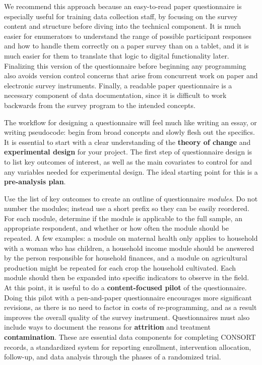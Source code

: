 We recommend this approach because an easy-to-read paper questionnaire
is especially useful for training data collection staff,
by focusing on the survey content and structure before diving into the technical component.
It is much easier for enumerators to understand the range of possible participant responses
and how to handle them correctly on a paper survey than on a tablet,
and it is much easier for them to translate that logic to digital functionality later.
Finalizing this version of the questionnaire before beginning any programming
also avoids version control concerns that arise from concurrent work
on paper and electronic survey instruments.
Finally, a readable paper questionnaire is a necessary component of data documentation,
since it is difficult to work backwards from the survey program to the intended concepts.

The workflow for designing a questionnaire will feel much like writing an essay, or writing pseudocode:
begin from broad concepts and slowly flesh out the specifics.
It is essential to start with a clear understanding of the
\textbf{theory of change}
and \textbf{experimental design} for your project.
The first step of questionnaire design is to list key outcomes of interest,
as well as the main covariates to control for and any variables needed for experimental design.
The ideal starting point for this is a \textbf{pre-analysis plan}.

Use the list of key outcomes to create an outline of questionnaire \textit{modules}.
Do not number the modules; instead use a short prefix so they can be easily reordered.
For each module, determine if the module is applicable to the full sample,
an appropriate respondent, and whether or how often the module should be repeated.
A few examples: a module on maternal health only applies to household with a woman who has children,
a household income module should be answered by the person responsible for household finances,
and a module on agricultural production might be repeated for each crop the household cultivated.
Each module should then be expanded into specific indicators to observe in the field.
At this point, it is useful to do a  \textbf{content-focused pilot}
of the questionnaire.
Doing this pilot with a pen-and-paper questionnaire encourages more significant revisions,
as there is no need to factor in costs of re-programming,
and as a result improves the overall quality of the survey instrument.
Questionnaires must also include ways to document the reasons for \textbf{attrition} and
treatment \textbf{contamination}.
These are essential data components for completing CONSORT records,
a standardized system for reporting enrollment, intervention allocation, follow-up,
and data analysis through the phases of a randomized trial.\cite{begg1996improving}

